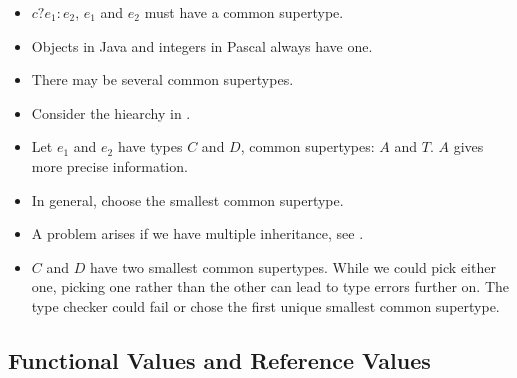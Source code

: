 \begin{itemize}

\item $c?e_1:e_2$, $e_1$ and $e_2$ must have a common supertype.

\item Objects in Java and integers in Pascal always have one.

\item There may be several common supertypes.

\item Consider the hiearchy in .


\item Let $e_1$ and $e_2$ have types $C$ and $D$, common supertypes: $A$ and
$T$. $A$ gives more precise information.

\item In general, choose the smallest common supertype.

\item A problem arises if we have multiple inheritance, see
.


\item $C$ and $D$ have two smallest common supertypes. While we could pick
either one, picking one rather than the other can lead to type errors further
on. The type checker could fail or chose the first unique smallest common
supertype.

\end{itemize}

\subsection{Functional Values and Reference Values}

